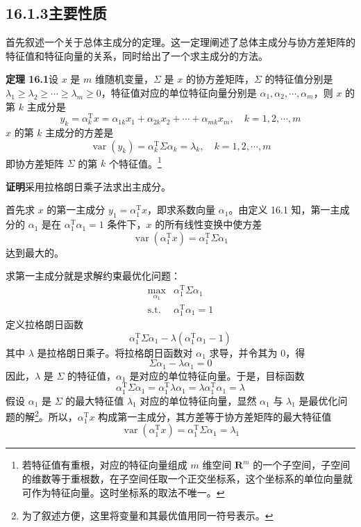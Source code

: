 \documentclass[UTF8,12pt,a4paper,fontset=fandol]{ctexart}
\begin{document}
\subsection*{16.1.3\quad 主要性质}

首先叙述一个关于总体主成分的定理。这一定理阐述了总体主成分与协方差矩阵的特征值和特征向量的关系，同时给出了一个求主成分的方法。

\noindent\textbf{定理 16.1}\quad 设 $x$ 是 $m$ 维随机变量，$\Sigma$ 是 $x$ 的协方差矩阵，$\Sigma$ 的特征值分别是 $\lambda_1\geqslant\lambda_2\geqslant\cdots\geqslant\lambda_m\geqslant 0$，特征值对应的单位特征向量分别是 $\alpha_1,\alpha_2,\cdots,\alpha_m$，则 $x$ 的第 $k$ 主成分是
\begin{equation}
y_k=\alpha_k^{\mathrm{T}}x=\alpha_{1k}x_1+\alpha_{2k}x_2+\cdots+\alpha_{mk}x_m,\quad k=1,2,\cdots,m
\tag{16.5}
\end{equation}
$x$ 的第 $k$ 主成分的方差是
\begin{equation}
\operatorname{var}(y_k)=\alpha_k^{\mathrm{T}}\Sigma\alpha_k=\lambda_k,\quad k=1,2,\cdots,m
\tag{16.6}
\end{equation}
即协方差矩阵 $\Sigma$ 的第 $k$ 个特征值。\footnote{若特征值有重根，对应的特征向量组成 $m$ 维空间 $\mathbf{R}^m$ 的一个子空间，子空间的维数等于重根数，在子空间任取一个正交坐标系，这个坐标系的单位向量就可作为特征向量。这时坐标系的取法不唯一。}

\noindent\textbf{证明}\quad 采用拉格朗日乘子法求出主成分。

首先求 $x$ 的第一主成分 $y_1=\alpha_1^{\mathrm{T}}x$，即求系数向量 $\alpha_1$。由定义 16.1 知，第一主成分的 $\alpha_1$ 是在 $\alpha_1^{\mathrm{T}}\alpha_1=1$ 条件下，$x$ 的所有线性变换中使方差
\[
\operatorname{var}(\alpha_1^{\mathrm{T}}x)=\alpha_1^{\mathrm{T}}\Sigma\alpha_1
\]
达到最大的。

求第一主成分就是求解约束最优化问题：
\begin{equation}
\begin{array}{ll}
\displaystyle\max_{\alpha_1} & \alpha_1^{\mathrm{T}}\Sigma\alpha_1\\[0.4em]
\mathrm{s.t.} & \alpha_1^{\mathrm{T}}\alpha_1=1
\end{array}
\tag{16.7}
\end{equation}
定义拉格朗日函数
\[
\alpha_1^{\mathrm{T}}\Sigma\alpha_1-\lambda(\alpha_1^{\mathrm{T}}\alpha_1-1)
\]
其中 $\lambda$ 是拉格朗日乘子。将拉格朗日函数对 $\alpha_1$ 求导，并令其为 0，得
\[
\Sigma\alpha_1-\lambda\alpha_1=0
\]
因此，$\lambda$ 是 $\Sigma$ 的特征值，$\alpha_1$ 是对应的单位特征向量。于是，目标函数
\[
\alpha_1^{\mathrm{T}}\Sigma\alpha_1=\alpha_1^{\mathrm{T}}\lambda\alpha_1=\lambda\alpha_1^{\mathrm{T}}\alpha_1=\lambda
\]
假设 $\alpha_1$ 是 $\Sigma$ 的最大特征值 $\lambda_1$ 对应的单位特征向量，显然 $\alpha_1$ 与 $\lambda_1$ 是最优化问题的解\footnote{为了叙述方便，这里将变量和其最优值用同一符号表示。}。所以，$\alpha_1^{\mathrm{T}}x$ 构成第一主成分，其方差等于协方差矩阵的最大特征值
\begin{equation}
\operatorname{var}(\alpha_1^{\mathrm{T}}x)=\alpha_1^{\mathrm{T}}\Sigma\alpha_1=\lambda_1
\tag{16.8}
\end{equation}
\end{document}
